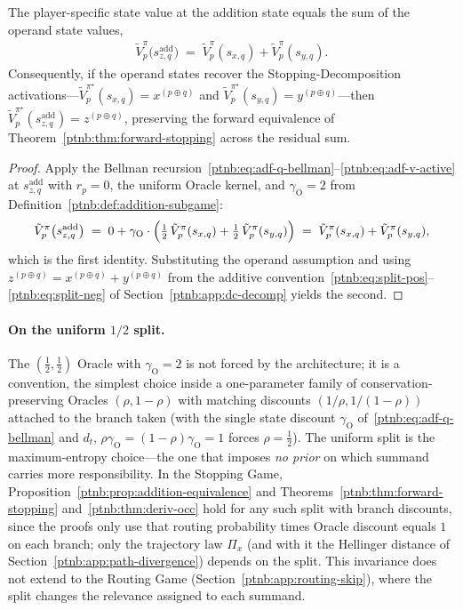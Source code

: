 \begin{proposition}\label{ptnb:prop:addition-equivalence}
The player-specific state value at the addition state equals the sum of the operand state values,
\begin{align}
    \tilde V_p^{\pi}\bigl(s_{z,q}^{\mathrm{add}}\bigr)
    \;=\;
    \tilde V_p^{\pi}(s_{x,q}) + \tilde V_p^{\pi}(s_{y,q}).
\end{align}
Consequently, if the operand states recover the Stopping-Decomposition activations---$\tilde
    V_p^{\pi^\star}(s_{x,q}) = x^{(p\oplus q)}$ and $\tilde V_p^{\pi^\star}(s_{y,q}) = y^{(p\oplus
    q)}$---then $\tilde V_p^{\pi^\star}(s_{z,q}^{\mathrm{add}}) = z^{(p\oplus q)}$, preserving the
forward equivalence of Theorem~\ref{ptnb:thm:forward-stopping} across the residual sum.
\end{proposition}

\begin{proof}
Apply the Bellman recursion~\eqref{ptnb:eq:adf-q-bellman}--\eqref{ptnb:eq:adf-v-active} at
$s_{z,q}^{\mathrm{add}}$ with $r_p = 0$, the uniform Oracle kernel, and $\gamma_{\mathrm{O}} = 2$
from Definition~\ref{ptnb:def:addition-subgame}:
\begin{align}
    \tilde V_p^{\pi}\bigl(s_{z,q}^{\mathrm{add}}\bigr)
    \;=\; 0 + \gamma_{\mathrm{O}} \cdot \Bigl(\tfrac{1}{2}\,\tilde V_p^{\pi}(s_{x,q}) +
    \tfrac{1}{2}\,\tilde V_p^{\pi}(s_{y,q})\Bigr)
    \;=\; \tilde V_p^{\pi}(s_{x,q}) + \tilde V_p^{\pi}(s_{y,q}),
\end{align}
which is the first identity. Substituting the operand assumption and using $z^{(p\oplus q)} =
    x^{(p\oplus q)} + y^{(p\oplus q)}$ from the additive
convention~\eqref{ptnb:eq:split-pos}--\eqref{ptnb:eq:split-neg} of Section~\ref{ptnb:app:dc-decomp} yields the
second.
\end{proof}

\paragraph{On the uniform $1/2$ split.}
The $(\tfrac{1}{2}, \tfrac{1}{2})$ Oracle with $\gamma_{\mathrm{O}} = 2$ is not forced by the
architecture; it is a convention, the simplest choice inside a one-parameter family of
conservation-preserving Oracles $(\rho, 1-\rho)$ with matching discounts $(1/\rho, 1/(1-\rho))$
attached to the branch taken (with the single state discount $\gamma_{\mathrm{O}}$
of~\eqref{ptnb:eq:adf-q-bellman} and $d_t$, $\rho\gamma_{\mathrm{O}}=(1-\rho)\gamma_{\mathrm{O}}=1$
forces $\rho=\tfrac12$). The uniform split is the maximum-entropy choice---the one that imposes
\emph{no prior} on which summand carries more responsibility. In the Stopping Game,
Proposition~\ref{ptnb:prop:addition-equivalence} and Theorems~\ref{ptnb:thm:forward-stopping}
and~\ref{ptnb:thm:deriv-occ} hold for any such split with branch discounts, since the proofs only use
that routing probability times Oracle discount equals $1$ on each branch; only the trajectory law
$\Pi_x$ (and with it the Hellinger distance of Section~\ref{ptnb:app:path-divergence}) depends on the
split. This invariance does not extend to the Routing Game (Section~\ref{ptnb:app:routing-skip}), where
the split changes the relevance assigned to each summand.


